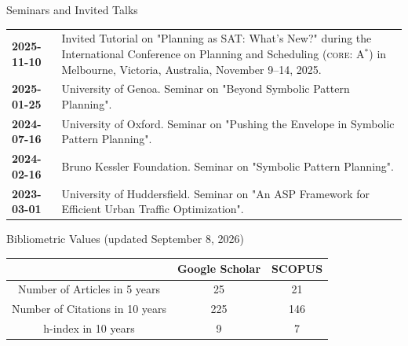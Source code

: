 \documentclass{resume} %
\begin{document}
 \begin{rSection}{Seminars and Invited Talks}
 	\begin{tabularx}{0.95\textwidth} {lp{14cm}}
 \textbf{2025-11-10} & Invited Tutorial on "Planning as SAT: What's New?" during the International Conference on Planning and Scheduling (\textsc{core}: A$^{*}$) in Melbourne, Victoria, Australia, November 9–14, 2025.\\
  \textbf{2025-01-25} & University of Genoa. Seminar on "Beyond Symbolic Pattern Planning".\\
 \textbf{2024-07-16} & University of Oxford. Seminar on "Pushing the Envelope in Symbolic Pattern Planning".\\
 \textbf{2024-02-16} & Bruno Kessler Foundation. Seminar on "Symbolic Pattern Planning".\\
 \textbf{2023-03-01} & University of Huddersfield. Seminar on "An ASP Framework for Efficient Urban Traffic Optimization".\\
 \end{tabularx}

\end{rSection}

\begin{rSection}{Bibliometric Values \tiny{(updated September 8, 2026)}}
\begin{center}
	
\begin{tabular}{ccc}

 & Google Scholar & SCOPUS \\ \hline
\multicolumn{1}{c}{Number of Articles in 5 years} & 25 & 21 \\ \hline
\multicolumn{1}{c}{Number of Citations in 10 years} & 225 & 146 \\ \hline
\multicolumn{1}{c}{h-index in 10 years} & 
9 & 7 \\ 
\end{tabular}%
\end{center}
\end{rSection}
\end{document}
